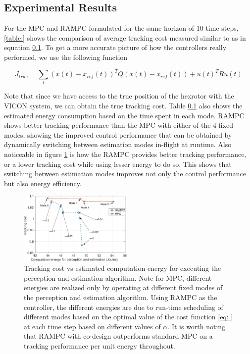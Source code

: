 \subsection{Experimental Results}

For the MPC and RAMPC formulated for the same horizon of 10 time steps, \ref{table:} shows the comparison of average tracking cost measured similar to as in equation \ref{}. To get a more accurate picture of how the controllers really performed, we use the following function


\begin{equation}
J_{true} = \sum_t (x(t)-x_{ref}(t))^{T}Q(x(t)-x_{ref}(t)) + u(t)^{T}Ru(t)
\end{equation}

Note that since we have access to the true position of the hexrotor with the VICON system, we can obtain the true tracking cost. Table \ref{} also shows the estimated energy consumption based on the time spent in each mode. RAMPC shows better tracking performance than the MPC with either of the 4 fixed modes, showing the improved control performance that can be obtained by dynamically switching between estimation modes in-flight at runtime. Also noticeable in figure \ref{fig:TrackingVsEnergy} is how the RAMPC provides better tracking performance, or a lower tracking cost while using lesser energy to do so. This shows that switching between estimation modes improves not only the control performance but also energy efficiency.


\begin{figure}[tbh]
	\centering
	\includegraphics[width=0.49\textwidth]{figures/TrackingVsEnergy}
	\caption{Tracking cost vs estimated computation energy for executing the perception and estimation algorithm. Note for MPC, different energies are realized only by operating at different fixed modes of the perception and estimation algorithm. Using RAMPC as the controller, the different energies are due to run-time scheduling of different modes based on the optimal value of the cost function \ref{eq: } at each time step based on different values of $\alpha$. It is worth noting that RAMPC with co-design outperforms standard MPC on a tracking performance per unit energy throughout.}
	\label{fig:TrackingVsEnergy}
\end{figure}


